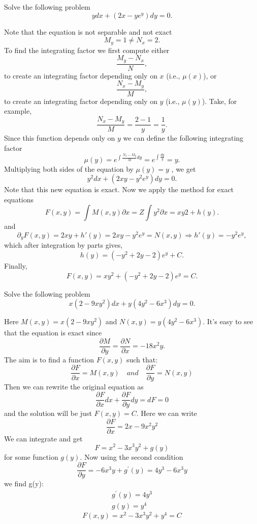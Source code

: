\documentclass[11pt]{article}
\begin{document}
\begin{problem}
Solve the following problem
\begin{equation*}
ydx + (2x - y e^{y}) dy = 0.
\end{equation*}
\end{problem}
\begin{solution}
Note that the equation is not separable and not exact
\[M _{y} = 1 \neq N_{ x} = 2 .\]
To find the integrating factor we first compute either
\[\frac {M_{ y} - N_{ x}} {N} ,\]
to create an integrating factor depending only on $x$ (i.e., $\mu( x )$), or
\[\frac{N_{ x} - M_{ y}}{ M} ,\]
to create an integrating factor depending only on $y$ (i.e., $\mu ( y )$).
Take, for example,
\[\frac{N_{ x} - M_{ y}}{ M} = \frac{2 - 1}{ y} = \frac{1}{y}.\]
Since this function depends only on $y$ we can define the following integrating factor 
\[\mu( y ) = e^{ \int \frac{N_{ x} - M_{ y}}{ M} dy }= e^{ \int \frac{ dy}{ y}} = y.\]
Multiplying both sides of the equation by $\mu ( y ) = y$ , we get
\[y^{ 2} dx + (2 xy - y^{ 2} e^{ y} ) dy = 0 .\]
Note that this new equation is exact.  Now we apply the method for exact equations
\[F ( x,y ) = \int M ( x,y ) \partial x = Z\int y^{ 2} \partial x = xy 2 + h ( y ) .\]
and
\[\partial_{ y} F ( x,y ) = 2 xy + h'( y ) = 2 xy - y^{ 2} e^{ y} = N ( x,y ) \Rightarrow h'( y ) = - y^{ 2} e^{ y} ,\]
which after integration by parts gives,
\[ h ( y ) = ( - y^{ 2} + 2 y - 2) e^{y} +C.\]
Finally,
\[\boxed{F ( x,y ) = xy^{ 2} + ( - y^{ 2} + 2 y - 2) e^{ y} = C }.\]
\end{solution}



\begin{problem}
Solve the following problem
\begin{equation*}
  x \left( 2 - 9xy^2 \right)dx + y(4y^2 - 6x^3) dy = 0.
\end{equation*}
\end{problem}
\begin{solution}
  Here $M(x, y) = x \left( 2 - 9xy^2 \right)$ and $N(x, y) = y(4y^2 - 6x^3)$.
  It's easy to see that the equation is exact since
  \[ \frac {\partial M} {\partial y} = \frac {\partial N} {\partial x}
    = - 18 x^2 y. \]
  The aim is to find a function $F(x, y)$ such that:
  \[ \frac {\partial F} {\partial x} = M(x, y) \quad and \quad
    \frac {\partial F} {\partial y} = N(x, y) \]
  Then we can rewrite the original equation as
  \[ \frac {\partial F} {\partial x} dx + \frac {\partial F} {\partial y} dy
    = d F = 0 \]
  and the solution will be just $F(x, y) = C$.
  Here we can write
  \[ \frac {\partial F} {\partial x} = 2x - 9x^2y^2 \]
  We can integrate and get
  \[ F = x^2 - 3 x^3 y^2 + g(y) \]
  for some function $g(y)$. Now using the second condition
  \[ \frac {\partial F} {\partial y} = -6x^3y + g^{\prime}(y) = 4y^3 - 6x^3y \]
  we find g(y):
  \begin{eqnarray*}
    g^{\prime}(y) = 4y^3 \\
    g(y) = y^4
  \end{eqnarray*}
 \[ \boxed{F(x, y) = x^2 - 3 x^3 y^2 + y^4 = C} \]  
\end{solution}
\end{document}
